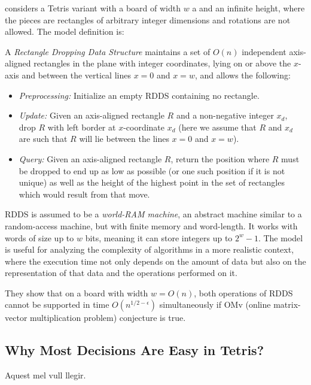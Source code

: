 \cite{TWRP} considers a Tetris variant with a board of width $w$ a and an infinite height, where the pieces are rectangles of arbitrary integer dimensions and rotations are not allowed. The model definition is:

\begin{definition}[RDDS]
  A \emph{Rectangle Dropping Data Structure} maintains a set of $O(n)$ independent axis-aligned rectangles in the plane with integer coordinates, lying on or above the $x$-axis and between the vertical lines $x = 0$ and $x = w$, and allows the following:

  \begin{itemize}
    \item \emph{Preprocessing:} Initialize an empty RDDS containing no rectangle.
    \item \emph{Update:} Given an axis-aligned rectangle $R$ and a non-negative integer $x_d$, drop $R$ with left border at $x$-coordinate $x_d$ (here we assume that $R$ and $x_d$ are such that $R$ will lie between the lines $x = 0$ and $x = w$).
    \item \emph{Query:} Given an axis-aligned rectangle $R$, return the position where $R$ must be dropped to end up as low as possible (or one such position if it is not unique) as well as the height of the highest point in the set of rectangles which would result from that move.
  \end{itemize}
\end{definition}

RDDS is assumed to be a \emph{world-RAM machine}, an abstract machine similar to a random-access machine, but with finite memory and word-length. It works with words of size up to $ w $ bits, meaning it can store integers up to $2^{w} - 1$. 
The model is useful for analyzing the complexity of algorithms in a more realistic context, where the execution time not only depends on the amount of data but also on the representation of that data and the operations performed on it. 

They show that on a board with width $w = O(n)$, both operations of RDDS  cannot be supported in time $O(n^{1 / 2 - \epsilon})$ simultaneously if OMv (online matrix-vector multiplication problem) conjecture is true. 


\subsection{Why Most Decisions Are Easy in Tetris?}

Aquest mel vull llegir.
